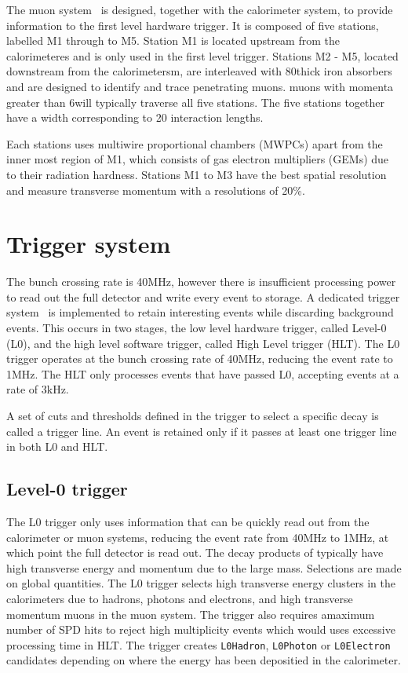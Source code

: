 The muon system~\cite{LHCb-DP-2013-001,LHCb-DP-2012-002} is designed, together with the calorimeter system, to provide information to the first level hardware trigger. It is composed of five stations, labelled M1 through to M5. Station M1 is located upstream from the calorimeteres and is only used in the first level trigger. Stations M2 - M5, located downstream from the calorimetersm, are interleaved with 80\cm thick iron absorbers and are designed to identify and trace penetrating muons. muons with momenta greater than 6\gevc will typically traverse all five stations. The five stations together have a width corresponding to 20 interaction lengths. 

Each stations uses multiwire proportional chambers (MWPCs) apart from the inner most region of M1, which consists of gas electron multipliers (GEMs) due to their radiation hardness. Stations M1 to M3 have the best spatial resolution and measure transverse momentum with a resolutions of 20\%.

\section{Trigger system}

The \lhc bunch crossing rate is 40MHz, however there is insufficient processing power to read out the full detector and write every event to storage. A dedicated trigger system~\cite{LHCb-DP-2012-004} is implemented to retain interesting events while discarding background events. This occurs in two stages, the low level hardware trigger, called Level-0 (L0), and the high level software trigger, called High Level trigger (HLT). The L0 trigger operates at the bunch crossing rate of 40MHz, reducing the event rate to 1MHz. The HLT only processes events that have passed L0, accepting events at a rate of 3kHz.

A set of cuts and thresholds defined in the trigger to select a specific decay is called a trigger line. An event is retained only if it passes at least one trigger line in both L0 and HLT.

\subsection{Level-0 trigger}

The L0 trigger only uses information that can be quickly read out from the calorimeter or muon systems, reducing the event rate from 40MHz to 1MHz, at which point the full detector is read out. The decay products of \B typically have high transverse energy and momentum due to the large \B  mass. Selections are made on global quantities. The L0 trigger selects high transverse energy clusters in the calorimeters due to hadrons, photons and electrons, and high transverse momentum muons in the muon system. The trigger also requires amaximum number of SPD hits to reject high multiplicity events which would uses excessive processing time in HLT. The trigger creates {\tt L0Hadron}, {\tt L0Photon} or {\tt L0Electron} candidates depending on where the energy has been depositied in the calorimeter.

